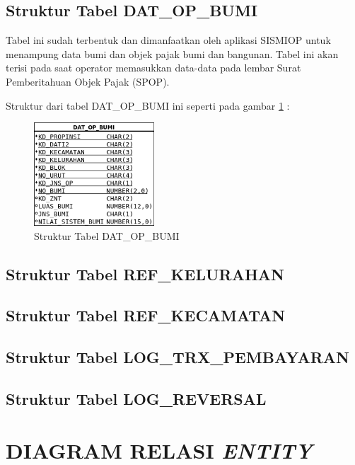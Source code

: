 \documentclass[pdftex,12pt, oneside]{article}
\begin{document}
\subsection{Struktur Tabel DAT\_OP\_BUMI}

Tabel ini sudah terbentuk dan dimanfaatkan oleh aplikasi SISMIOP untuk menampung data bumi dan objek pajak bumi dan bangunan. Tabel ini akan terisi pada saat operator memasukkan data-data pada lembar Surat Pemberitahuan Objek Pajak (SPOP). 

Struktur dari tabel DAT\_OP\_BUMI ini seperti pada gambar \ref{fig:tabel-dat-op-bumi} : 

\begin{figure}[H]
	\centering
	\includegraphics[width=0.4\textwidth]{./resources/03-struktur-tabel-dat-op-bumi}
	\caption{Struktur Tabel DAT\_OP\_BUMI}
	\label{fig:tabel-dat-op-bumi}
\end{figure}

\subsection{Struktur Tabel REF\_KELURAHAN}



\subsection{Struktur Tabel REF\_KECAMATAN}

\subsection{Struktur Tabel LOG\_TRX\_PEMBAYARAN}

\subsection{Struktur Tabel LOG\_REVERSAL}


\section{DIAGRAM RELASI \textit{ENTITY}}
\end{document}
